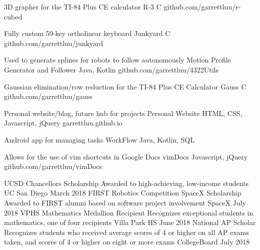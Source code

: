 \documentclass[]{awesome-cv}
\begin{document}
\vspace{-7mm}
\begin{cventries}
	\cventry
	{3D grapher for the TI-84 Plus CE calculator}
	{R-3}
	{C}
	{github.com/garrettluu/r-cubed}
	{}
	
	\vspace{-5mm}
	\cventry
	{Fully custom 59-key ortholinear keyboard}
	{Junkyard}
	{C}
	{github.com/garrettluu/junkyard}
	{}
	
	\vspace{-5mm}
	\cventry
	{Used to generate splines for robots to follow autonomously}
	{Motion Profile Generator and Follower}
	{Java, Kotlin}
	{github.com/garrettluu/4322Utils}
	{}
	
	\vspace{-5mm}
	\cventry
	{Gaussian elimination/row reduction for the TI-84 Plus CE Calculator}
	{Gauss}
	{C}
	{github.com/garrettluu/gauss}
	{}
	
	\vspace{-5mm}
	\cventry
	{Personal website/blog, future hub for projects}
	{Personal Website}
	{HTML, CSS, Javascript, jQuery}
	{garrettluu.github.io}
	{}
	
	\vspace{-5mm}
	\cventry
	{Android app for managing tasks}
	{WorkFlow}
	{Java, Kotlin, SQL}
	{}
	{}

	\vspace{-5mm}
	\cventry
	{Allows for the use of vim shortcuts in Google Docs}
	{vimDocs}
	{Javascript, jQuery}
	{github.com/garrettluu/vimDocs}
	{}
\end{cventries}
\begin{cvhonors}
	\cvhonor
	{UCSD Chancellor\textquotesingle{}s Scholarship}
	{Awarded to high-achieving, low-income students}
	{UC San Diego}
	{March 2018}
	\cvhonor
	{FIRST Robotics Competition SpaceX Scholarship}
	{Awarded to FIRST alumni based on software project involvement}
	{SpaceX}
	{July 2018}
	\cvhonor
	{VPHS Mathematics Medallion Recipient}
	{Recognizes exceptional students in mathematics, one of four recipients}
	{Villa Park HS}
	{June 2018}
	\cvhonor
	{National AP Scholar}
	{Recognizes students who received average scores of 4 or higher on all AP exams taken, and scores of 4 or higher on eight or more exams}
	{CollegeBoard}
	{July 2018}
\end{cvhonors}
\end{document}
